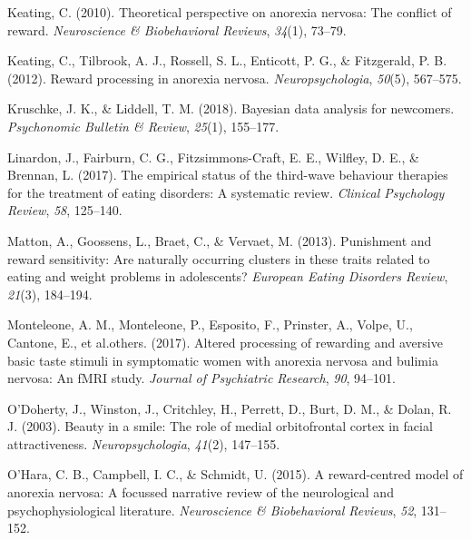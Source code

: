 \documentclass[
  man,floatsintext]{apa6}
\newlength{\cslhangindent}
\newlength{\cslentryspacingunit} %
\newenvironment{CSLReferences}[2] %
 {%
  \setlength{\parindent}{0pt}
  \ifodd #1
  \let\oldpar\par
  \def\par{\hangindent=\cslhangindent\oldpar}
  \fi
  \setlength{\parskip}{#2\cslentryspacingunit}
 }%
 {}
\begin{document}
\begin{CSLReferences}{1}{0}
\leavevmode{}%
Keating, C. (2010). Theoretical perspective on anorexia nervosa: The conflict of reward. \emph{Neuroscience \& Biobehavioral Reviews}, \emph{34}(1), 73--79.

\leavevmode{}%
Keating, C., Tilbrook, A. J., Rossell, S. L., Enticott, P. G., \& Fitzgerald, P. B. (2012). Reward processing in anorexia nervosa. \emph{Neuropsychologia}, \emph{50}(5), 567--575.

\leavevmode{}%
Kruschke, J. K., \& Liddell, T. M. (2018). Bayesian data analysis for newcomers. \emph{Psychonomic Bulletin \& Review}, \emph{25}(1), 155--177.

\leavevmode{}%
Linardon, J., Fairburn, C. G., Fitzsimmons-Craft, E. E., Wilfley, D. E., \& Brennan, L. (2017). The empirical status of the third-wave behaviour therapies for the treatment of eating disorders: A systematic review. \emph{Clinical Psychology Review}, \emph{58}, 125--140.

\leavevmode{}%
Matton, A., Goossens, L., Braet, C., \& Vervaet, M. (2013). Punishment and reward sensitivity: Are naturally occurring clusters in these traits related to eating and weight problems in adolescents? \emph{European Eating Disorders Review}, \emph{21}(3), 184--194.

\leavevmode{}%
Monteleone, A. M., Monteleone, P., Esposito, F., Prinster, A., Volpe, U., Cantone, E., et al.others. (2017). Altered processing of rewarding and aversive basic taste stimuli in symptomatic women with anorexia nervosa and bulimia nervosa: An fMRI study. \emph{Journal of Psychiatric Research}, \emph{90}, 94--101.

\leavevmode{}%
O'Doherty, J., Winston, J., Critchley, H., Perrett, D., Burt, D. M., \& Dolan, R. J. (2003). Beauty in a smile: The role of medial orbitofrontal cortex in facial attractiveness. \emph{Neuropsychologia}, \emph{41}(2), 147--155.

\leavevmode{}%
O'Hara, C. B., Campbell, I. C., \& Schmidt, U. (2015). A reward-centred model of anorexia nervosa: A focussed narrative review of the neurological and psychophysiological literature. \emph{Neuroscience \& Biobehavioral Reviews}, \emph{52}, 131--152.


\end{CSLReferences}
\end{document}

